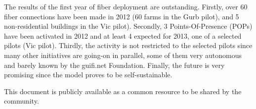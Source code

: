 The results of the first year of fiber deployment are outstanding. Firstly, over 60 fiber connections have been made in 2012 (60 farms in the Gurb pilot), and 5 non-residential buildings in the Vic pilot). Secondly, 3 Points-Of-Presence (POPs) have been activated in 2012 and at least 4 expected for 2013, one of a selected pilots (Vic pilot). Thirdly, the activity is not restricted to the selected pilots since many other initiatives are going-on in parallel, some of them very autonomous and barely known by the guifi.net Foundation. Finally, the future is very promising since the model proves to be self-sustainable.

This document is publicly available as a common resource to be shared by the community.